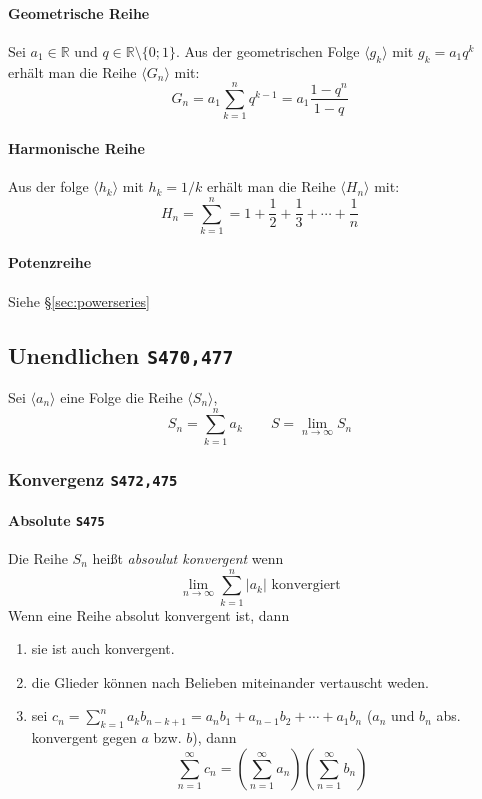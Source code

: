 \documentclass[margin=small, twocolumn]{hsrzf}
\numberwithin{equation}{subsection}
\newcommand{\brpage}[1]{\textcolor{red!70!black}{\small\texttt{S#1}}}
\begin{document}
\paragraph{Geometrische Reihe}
Sei \(a_1 \in \mathbb{R}\) und \(q \in \mathbb{R} \setminus \{0;1\}\). Aus der geometrischen Folge \(\langle g_k \rangle\) mit \(g_k = a_1 q^k\) erh\"alt man die Reihe \(\langle G_n \rangle\) mit:
\[
    G_n = a_1 \sum_{k=1}^n q^{k-1} = a_1 \frac{1-q^n}{1-q}
\]
    
\paragraph{Harmonische Reihe}
Aus der folge \(\langle h_k \rangle\) mit \(h_k = 1/k\) erh\"alt man die Reihe \(\langle H_n \rangle\) mit:
\[
    H_n = \sum_{k=1}^n = 1 + \frac{1}{2} + \frac{1}{3} + \cdots + \frac{1}{n}
\]

\paragraph{Potenzreihe} Siehe \S\ref{sec:powerseries}

\subsection{Unendlichen \brpage{470,477}}
Sei \(\langle a_n \rangle\) eine Folge die Reihe \(\langle S_n \rangle\),
\[
    S_n = \sum_{k=1}^n a_k \qquad S = \lim_{n\to\infty} S_n
\]

\subsubsection{Konvergenz \brpage{472,475}}

\paragraph{Absolute \brpage{475}}
Die Reihe \(S_n\) hei{\ss}t \emph{absoulut konvergent} wenn
\[
    \lim_{n\to\infty} \sum_{k=1}^n \left| a_k \right| \text{ konvergiert}
\]
Wenn eine Reihe absolut konvergent ist, dann
\begin{enumerate}
    \item sie ist auch konvergent.
    \item die Glieder k\"onnen nach Belieben miteinander vertauscht weden.
    \item sei \(\displaystyle 
        c_n = \sum_{k=1}^n a_k b_{n-k+1} = a_n b_1 + a_{n-1} b_2 + \cdots + a_1 b_n
    \) (\(a_n\) und \(b_n\) abs. konvergent gegen \(a\) bzw. \(b\)), dann
    \[
        \sum_{n=1}^\infty c_n = 
        \left(\sum_{n=1}^\infty a_n\right)
        \left(\sum_{n=1}^\infty b_n\right)
    \]
\end{enumerate}
\end{document}
